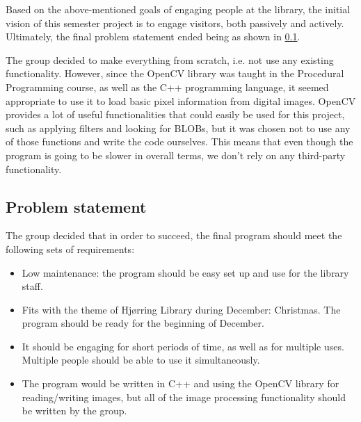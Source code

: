 Based on the above-mentioned goals of engaging people at the library, the initial vision of this semester project is to engage visitors, both passively and actively. Ultimately, the final problem statement ended being as shown in \ref{problemStatement}.

The group decided to make everything from scratch, i.e. not use any existing functionality. However, since the OpenCV library was taught in the Procedural Programming course, as well as the C++ programming language, it seemed appropriate to use it to load basic pixel information from digital images. OpenCV provides a lot of useful functionalities that could easily be used for this project, such as applying filters and looking for BLOBs, but it was chosen not to use any of those functions and write the code ourselves. This means that even though the program is going to be slower in overall terms, we don't rely on any third-party functionality.

\subsection{Problem statement}\label{problemStatement}
The group decided that in order to succeed, the final program should meet the following sets of requirements:

\begin{itemize}
\item Low maintenance: the program should be easy set up and use for the library staff.
\item Fits with the theme of Hj{\o}rring Library during December: Christmas. The program should be ready for the beginning of December.
\item It should be engaging for short periods of time, as well as for multiple uses. Multiple people should be able to use it simultaneously.
\item The program would be written in C++ and using the OpenCV library for reading/writing images, but all of the image processing functionality should be written by the group.
\end{itemize}
